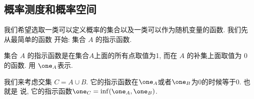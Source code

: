 \subsection*{概率测度和概率空间}

我们希望选取一类可以定义概率的集合以及一类可以作为随机变量的函数. 我们先从最简单的函数
开始: 集合 $A$ 的指示函数. 

\begin{definition*}
    集合 $A$ 的指示函数是在集合$A$上面的所有点取值为1, 而在 $A$ 的补集上面取值为
    0的函数. 用 $\one_A$表示. 
\end{definition*}

我们来考虑交集 $C=A\cup B$. 它的指示函数在$\one_A$或者$\one_B$为0的时候等于0. 也就是
说, 它的指示函数$\one_C=\inf(\one_A, \one_B)$. 
